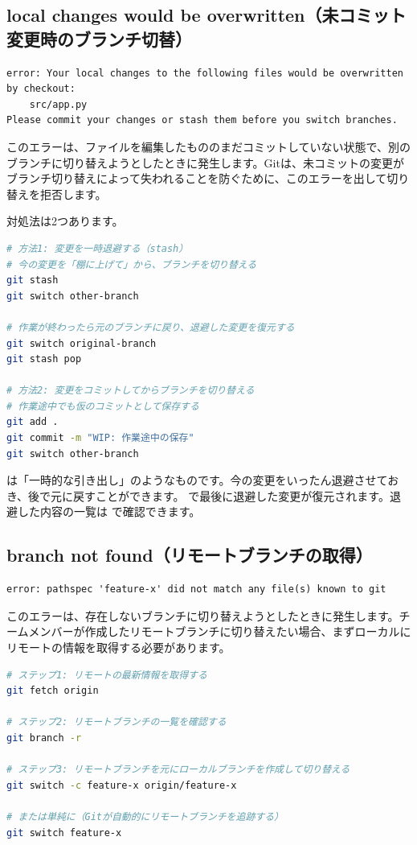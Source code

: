 \subsection{local changes would be overwritten（未コミット変更時のブランチ切替）}

\begin{lstlisting}[language={}]
error: Your local changes to the following files would be overwritten by checkout:
    src/app.py
Please commit your changes or stash them before you switch branches.
\end{lstlisting}

このエラーは、ファイルを編集したもののまだコミットしていない状態で、別のブランチに切り替えようとしたときに発生します。Gitは、未コミットの変更がブランチ切り替えによって失われることを防ぐために、このエラーを出して切り替えを拒否します。

対処法は2つあります。

\begin{lstlisting}[language=bash]
# 方法1: 変更を一時退避する（stash）
# 今の変更を「棚に上げて」から、ブランチを切り替える
git stash
git switch other-branch

# 作業が終わったら元のブランチに戻り、退避した変更を復元する
git switch original-branch
git stash pop

# 方法2: 変更をコミットしてからブランチを切り替える
# 作業途中でも仮のコミットとして保存する
git add .
git commit -m "WIP: 作業途中の保存"
git switch other-branch
\end{lstlisting}

 は「一時的な引き出し」のようなものです。今の変更をいったん退避させておき、後で元に戻すことができます。 で最後に退避した変更が復元されます。退避した内容の一覧は  で確認できます。

\subsection{branch not found（リモートブランチの取得）}

\begin{lstlisting}[language={}]
error: pathspec 'feature-x' did not match any file(s) known to git
\end{lstlisting}

このエラーは、存在しないブランチに切り替えようとしたときに発生します。チームメンバーが作成したリモートブランチに切り替えたい場合、まずローカルにリモートの情報を取得する必要があります。

\begin{lstlisting}[language=bash]
# ステップ1: リモートの最新情報を取得する
git fetch origin

# ステップ2: リモートブランチの一覧を確認する
git branch -r

# ステップ3: リモートブランチを元にローカルブランチを作成して切り替える
git switch -c feature-x origin/feature-x

# または単純に（Gitが自動的にリモートブランチを追跡する）
git switch feature-x
\end{lstlisting}

